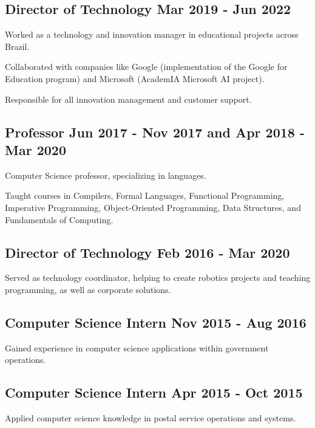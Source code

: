 \documentclass[letter,10pt]{article}
\begin{document}
\subsection{{Director of Technology \hfill Mar 2019 - Jun 2022}}
\begin{zitemize}
\item Worked as a technology and innovation manager in educational projects across Brazil.
\item Collaborated with companies like Google (implementation of the Google for Education program) and Microsoft (AcademIA Microsoft AI project).
\item Responsible for all innovation management and customer support.
\end{zitemize}

\subsection{{Professor \hfill Jun 2017 - Nov 2017 and Apr 2018 - Mar 2020}}
\begin{zitemize}
\item Computer Science professor, specializing in languages.
\item Taught courses in Compilers, Formal Languages, Functional Programming, Imperative Programming, Object-Oriented Programming, Data Structures, and Fundamentals of Computing.
\end{zitemize}

\subsection{{Director of Technology \hfill Feb 2016 - Mar 2020}}
\begin{zitemize}
\item Served as technology coordinator, helping to create robotics projects and teaching programming, as well as corporate solutions.
\end{zitemize}

\subsection{{Computer Science Intern \hfill Nov 2015 - Aug 2016}}
\begin{zitemize}
\item Gained experience in computer science applications within government operations.
\end{zitemize}

\subsection{{Computer Science Intern \hfill Apr 2015 - Oct 2015}}
\begin{zitemize}
\item Applied computer science knowledge in postal service operations and systems.
\end{zitemize}
\end{document}
